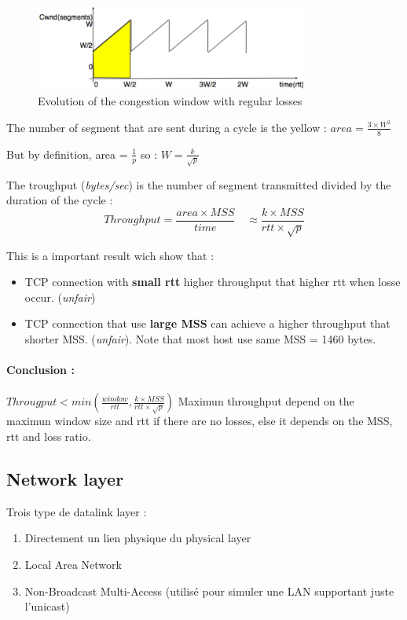 \begin{figure}[h]
    \centering
    \includegraphics[width=9cm]{modelingtcp.png}
    \caption{Evolution of the congestion window with regular losses}
\end{figure}

\begin{description}
    \item The number of segment that are sent during a cycle is the yellow : 
    $ area = \frac{3 \times W^2}{8}$
    \item But by definition, area = $\frac{1}{p}$ so : $ W = \frac{k}{\sqrt{p}}$
    \item The troughput (\textit{bytes/sec}) is the number of segment transmitted divided
        by the duration of the cycle : $$Throughput = \frac{area \times MSS}{time} \quad \approx \frac{k \times MSS}{rtt \times \sqrt{p}}$$
\end{description}

This is a important result wich show that :
\begin{itemize}
    \item TCP connection with \textbf{small rtt} higher throughput that higher rtt
        when losse occur. (\textit{unfair})
    \item TCP connection that use \textbf{large MSS} can achieve a higher throughput that
        shorter MSS. (\textit{unfair}). Note that most host use same MSS = 1460 bytes.
\end{itemize}

\paragraph{Conclusion :} $Througput < min( \frac{window}{rtt}, \frac{k \times MSS}{rtt \times \sqrt{p}})$
Maximun throughput depend on the maximun window size and rtt if there are no losses,
else it depends on the MSS, rtt and loss ratio.

\subsection{Network layer}
Trois type de datalink layer :
\begin{enumerate}
    \item Directement un lien physique du physical layer
    \item Local Area Network
    \item Non-Broadcast Multi-Access (utilisé pour simuler une LAN supportant
        juste l'unicast)
\end{enumerate}

